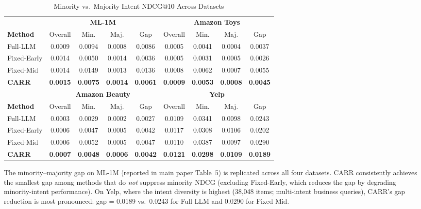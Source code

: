 \documentclass[letterpaper,10pt]{article}
\begin{document}
\begin{table}[h!]
\centering
\caption{Minority vs.\ Majority Intent NDCG@10 Across Datasets\label{tab:supp-minority-all}}
\begin{tabular}{l|cccc|cccc}
\toprule
& \multicolumn{4}{c|}{\textbf{ML-1M}} & \multicolumn{4}{c}{\textbf{Amazon Toys}} \\
\textbf{Method} & Overall & Min. & Maj. & Gap & Overall & Min. & Maj. & Gap \\
\midrule
Full-LLM   & 0.0009 & 0.0094 & 0.0008 & 0.0086 & 0.0005 & 0.0041 & 0.0004 & 0.0037 \\
Fixed-Early& 0.0014 & 0.0050 & 0.0014 & 0.0036 & 0.0005 & 0.0031 & 0.0005 & 0.0026 \\
Fixed-Mid  & 0.0014 & 0.0149 & 0.0013 & 0.0136 & 0.0008 & 0.0062 & 0.0007 & 0.0055 \\
\textbf{CARR} & \textbf{0.0015} & \textbf{0.0075} & \textbf{0.0014} & \textbf{0.0061} & \textbf{0.0009} & \textbf{0.0053} & \textbf{0.0008} & \textbf{0.0045} \\
\midrule
& \multicolumn{4}{c|}{\textbf{Amazon Beauty}} & \multicolumn{4}{c}{\textbf{Yelp}} \\
\textbf{Method} & Overall & Min. & Maj. & Gap & Overall & Min. & Maj. & Gap \\
\midrule
Full-LLM   & 0.0003 & 0.0029 & 0.0002 & 0.0027 & 0.0109 & 0.0341 & 0.0098 & 0.0243 \\
Fixed-Early& 0.0006 & 0.0047 & 0.0005 & 0.0042 & 0.0117 & 0.0308 & 0.0106 & 0.0202 \\
Fixed-Mid  & 0.0006 & 0.0052 & 0.0005 & 0.0047 & 0.0110 & 0.0387 & 0.0097 & 0.0290 \\
\textbf{CARR} & \textbf{0.0007} & \textbf{0.0048} & \textbf{0.0006} & \textbf{0.0042} & \textbf{0.0121} & \textbf{0.0298} & \textbf{0.0109} & \textbf{0.0189} \\
\bottomrule
\end{tabular}
\end{table}

The minority--majority gap on ML-1M (reported in main paper Table~5) is replicated across all four datasets. CARR consistently achieves the smallest gap among methods that do \emph{not} suppress minority NDCG (excluding Fixed-Early, which reduces the gap by degrading minority-intent performance). On Yelp, where the intent diversity is highest (38,048 items; multi-intent business queries), CARR's gap reduction is most pronounced: gap = 0.0189 vs.\ 0.0243 for Full-LLM and 0.0290 for Fixed-Mid.
\end{document}
